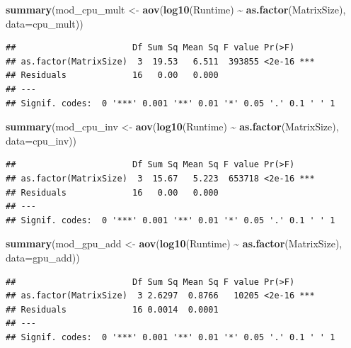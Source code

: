 \documentclass[
]{article}
\newenvironment{Shaded}{\begin{snugshade}}{\end{snugshade}}
\newcommand{\DataTypeTok}[1]{\textcolor[rgb]{0.13,0.29,0.53}{#1}}
\newcommand{\KeywordTok}[1]{\textcolor[rgb]{0.13,0.29,0.53}{\textbf{#1}}}
\newcommand{\NormalTok}[1]{#1}
\newcommand{\OperatorTok}[1]{\textcolor[rgb]{0.81,0.36,0.00}{\textbf{#1}}}
\newcommand{\StringTok}[1]{\textcolor[rgb]{0.31,0.60,0.02}{#1}}
\begin{document}
\begin{Shaded}
\begin{Highlighting}[]
\KeywordTok{summary}\NormalTok{(mod\_cpu\_mult \textless{}{-}}\StringTok{ }\KeywordTok{aov}\NormalTok{(}\KeywordTok{log10}\NormalTok{(Runtime) }\OperatorTok{\textasciitilde{}}\StringTok{ }\KeywordTok{as.factor}\NormalTok{(MatrixSize), }\DataTypeTok{data=}\NormalTok{cpu\_mult))}
\end{Highlighting}
\end{Shaded}

\begin{verbatim}
##                       Df Sum Sq Mean Sq F value Pr(>F)    
## as.factor(MatrixSize)  3  19.53   6.511  393855 <2e-16 ***
## Residuals             16   0.00   0.000                   
## ---
## Signif. codes:  0 '***' 0.001 '**' 0.01 '*' 0.05 '.' 0.1 ' ' 1
\end{verbatim}

\begin{Shaded}
\begin{Highlighting}[]
\KeywordTok{summary}\NormalTok{(mod\_cpu\_inv \textless{}{-}}\StringTok{ }\KeywordTok{aov}\NormalTok{(}\KeywordTok{log10}\NormalTok{(Runtime) }\OperatorTok{\textasciitilde{}}\StringTok{ }\KeywordTok{as.factor}\NormalTok{(MatrixSize), }\DataTypeTok{data=}\NormalTok{cpu\_inv))}
\end{Highlighting}
\end{Shaded}

\begin{verbatim}
##                       Df Sum Sq Mean Sq F value Pr(>F)    
## as.factor(MatrixSize)  3  15.67   5.223  653718 <2e-16 ***
## Residuals             16   0.00   0.000                   
## ---
## Signif. codes:  0 '***' 0.001 '**' 0.01 '*' 0.05 '.' 0.1 ' ' 1
\end{verbatim}

\begin{Shaded}
\begin{Highlighting}[]
\KeywordTok{summary}\NormalTok{(mod\_gpu\_add \textless{}{-}}\StringTok{ }\KeywordTok{aov}\NormalTok{(}\KeywordTok{log10}\NormalTok{(Runtime) }\OperatorTok{\textasciitilde{}}\StringTok{ }\KeywordTok{as.factor}\NormalTok{(MatrixSize), }\DataTypeTok{data=}\NormalTok{gpu\_add))}
\end{Highlighting}
\end{Shaded}

\begin{verbatim}
##                       Df Sum Sq Mean Sq F value Pr(>F)    
## as.factor(MatrixSize)  3 2.6297  0.8766   10205 <2e-16 ***
## Residuals             16 0.0014  0.0001                   
## ---
## Signif. codes:  0 '***' 0.001 '**' 0.01 '*' 0.05 '.' 0.1 ' ' 1
\end{verbatim}
\end{document}
